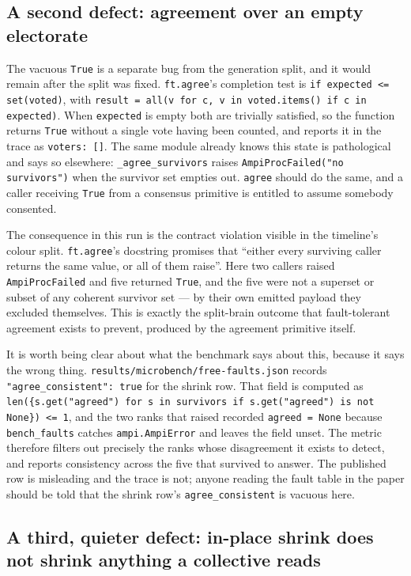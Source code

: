 \documentclass[11pt]{article}
\begin{document}
\subsection{A second defect: agreement over an empty electorate}

The vacuous \texttt{True} is a separate bug from the generation split, and it would remain
after the split was fixed. \texttt{ft.agree}'s completion test is
\texttt{if expected <= set(voted)}, with \texttt{result = all(v for c, v in voted.items()
if c in expected)}. When \texttt{expected} is empty both are trivially satisfied, so the
function returns \texttt{True} without a single vote having been counted, and reports it
in the trace as \texttt{voters:\ []}. The same module already knows this state is
pathological and says so elsewhere: \texttt{\_agree\_survivors} raises
\texttt{AmpiProcFailed("no survivors")} when the survivor set empties out. \texttt{agree}
should do the same, and a caller receiving \texttt{True} from a consensus primitive is
entitled to assume somebody consented.

The consequence in this run is the contract violation visible in the timeline's colour
split. \texttt{ft.agree}'s docstring promises that ``either every surviving caller returns
the same value, or all of them raise''. Here two callers raised
\texttt{AmpiProcFailed} and five returned \texttt{True}, and the five were not a
superset or subset of any coherent survivor set --- by their own emitted payload they
excluded themselves. This is exactly the split-brain outcome that fault-tolerant
agreement exists to prevent, produced by the agreement primitive itself.

It is worth being clear about what the benchmark says about this, because it says the
wrong thing. \texttt{results/microbench/free-faults.json} records
\texttt{"agree\_consistent": true} for the shrink row. That field is computed as
\texttt{len(\{s.get("agreed") for s in survivors if s.get("agreed") is not None\}) <= 1},
and the two ranks that raised recorded \texttt{agreed = None} because
\texttt{bench\_faults} catches \texttt{ampi.AmpiError} and leaves the field unset. The
metric therefore filters out precisely the ranks whose disagreement it exists to detect,
and reports consistency across the five that survived to answer. The published row is
misleading and the trace is not; anyone reading the fault table in the paper should be
told that the shrink row's \texttt{agree\_consistent} is vacuous here.

\subsection{A third, quieter defect: in-place shrink does not shrink anything a collective reads}
\end{document}
